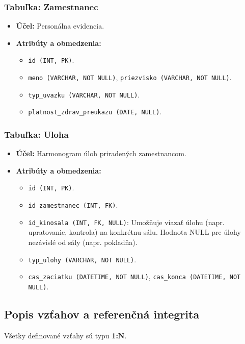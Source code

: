 \documentclass[11pt, a4paper]{article}
\begin{document}
\subsubsection{Tabuľka: Zamestnanec}
\begin{itemize}
    \item \textbf{Účel:} Personálna evidencia.
    \item \textbf{Atribúty a obmedzenia:}
    \begin{itemize}
        \item \texttt{id (INT, PK)}.
        \item \texttt{meno (VARCHAR, NOT NULL)}, \texttt{priezvisko (VARCHAR, NOT NULL)}.
        \item \texttt{typ\_uvazku (VARCHAR, NOT NULL)}.
        \item \texttt{platnost\_zdrav\_preukazu (DATE, NULL)}.
    \end{itemize}
\end{itemize}

\subsubsection{Tabuľka: Uloha}
\begin{itemize}
    \item \textbf{Účel:} Harmonogram úloh priradených zamestnancom.
    \item \textbf{Atribúty a obmedzenia:}
    \begin{itemize}
        \item \texttt{id (INT, PK)}.
        \item \texttt{id\_zamestnanec (INT, FK)}.
        \item \texttt{id\_kinosala (INT, FK, NULL)}: Umožňuje viazať úlohu (napr. upratovanie, kontrola) na konkrétnu sálu. Hodnota NULL pre úlohy nezávislé od sály (napr. pokladňa).
        \item \texttt{typ\_ulohy (VARCHAR, NOT NULL)}.
        \item \texttt{cas\_zaciatku (DATETIME, NOT NULL)}, \texttt{cas\_konca (DATETIME, NOT NULL)}.
    \end{itemize}
\end{itemize}

\subsection{Popis vzťahov a referenčná integrita}

Všetky definované vzťahy sú typu \textbf{1:N}.
\end{document}
